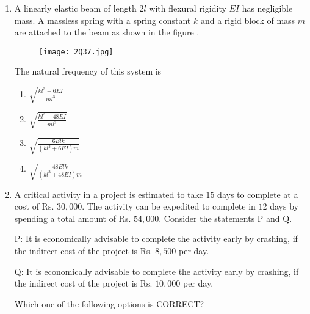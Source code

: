 \documentclass[journal,12pt,onecolumn]{article}
\theoremstyle{remark}
\begin{document}
\begin{enumerate}
    \item A linearly elastic beam of length $2l$ with flexural rigidity $EI$ has negligible mass.
    A massless spring with a spring constant $k$ and a rigid block of mass $m$ are attached
    to the beam as shown in the figure .
    \begin{figure}[H]
        \centering
        \texttt{[image: 2Q37.jpg]}
        \caption{}
        \label{fig:q37}
    \end{figure}
    The natural frequency of this system is
    
    \hfill{}
    \begin{enumerate}
        \item $\sqrt{\frac{kl^3 + 6EI}{ml^3}}$
        \item $\sqrt{\frac{kl^3 + 48EI}{ml^3}}$
        \item $\sqrt{\frac{6Elk}{(kl^3 + 6EI)m}}$
        \item $\sqrt{\frac{48Elk}{(kl^3 + 48EI)m}}$
    \end{enumerate}

    \item A critical activity in a project is estimated to take $15$ days to complete at a cost of Rs.
    $30,000$. The activity can be expedited to complete in $12$ days by spending a total
    amount of Rs. $54,000$. Consider the statements P and Q.
    
    P: It is economically advisable to complete the activity early by crashing, if the
    indirect cost of the project is Rs. $8,500$ per day.
    
    Q: It is economically advisable to complete the activity early by crashing, if the
    indirect cost of the project is Rs. $10,000$ per day.
    
    Which one of the following options is CORRECT?
    
    \hfill{}
    \begin{enumerate}
    \end{enumerate}


\end{enumerate}
\end{document}
